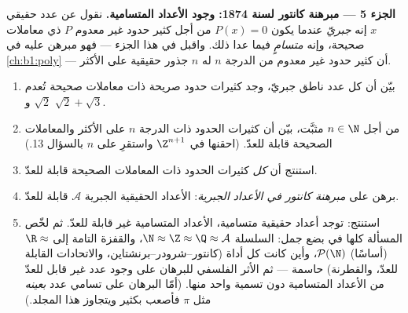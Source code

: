 \begin{problem}
\medskip
\noindent\textbf{الجزء 5 --- مبرهنة كانتور لسنة 1874: وجود الأعداد
المتسامية.} نقول عن عدد حقيقي $x$ إنه \emph{جبريّ}
 عندما يكون $P(x) = 0$ من أجل كثير حدود غير معدوم
$P$ ذي معاملات صحيحة، وإنه \emph{متسامٍ}
 فيما عدا ذلك. واقبل في هذا الجزء --- فهو مبرهن
عليه في \cref{ch:b1:poly} --- أن كثير حدود غير معدوم من
الدرجة $n$ له $n$ جذور حقيقية على الأكثر.
\begin{enumerate}[resume]
  \item بيّن أن كل عدد ناطق جبريّ، وجد كثيرات حدود صريحة ذات
        معاملات صحيحة تُعدم $\sqrt 2$ و $\sqrt 2 + \sqrt 3$.
  \item من أجل $n \in \N$ مثبَّت، بيّن أن  كثيرات الحدود ذات
        الدرجة $n$ على الأكثر والمعاملات الصحيحة قابلة للعدّ.
        (احقنها في $\Z^{n+1}$ واستقرِ على $n$ بالسؤال 13.)
  \item استنتج أن  \emph{كل} كثيرات الحدود ذات المعاملات
        الصحيحة قابلة للعدّ.
  \item برهن على \emph{مبرهنة كانتور في الأعداد الجبرية}: 
        الأعداد الحقيقية الجبرية $\mathcal{A}$ قابلة للعدّ.
  \item استنتج: توجد أعداد حقيقية متسامية،  الأعداد
        المتسامية غير قابلة للعدّ. ثم لخّص المسألة كلها في بضع
        جمل: السلسلة $\N \approx
        \Z \approx \Q \approx \mathcal{A}$، والقفزة التامة إلى $\R
        \approx$ (أساسًا) $\mathcal{P}(\N)$، وأين كانت كل أداة
        (كانتور--شرودر--برنشتاين، والاتحادات القابلة للعدّ،
        والقطرنة) حاسمة --- ثم الأثر الفلسفي للبرهان على وجود
        عدد غير قابل للعدّ من الأعداد المتسامية دون تسمية واحد
        منها. (أمّا البرهان على تسامي عدد \emph{بعينه} مثل
        $\pi$ فأصعب بكثير ويتجاوز هذا المجلد.)
\end{enumerate}
\end{problem}
